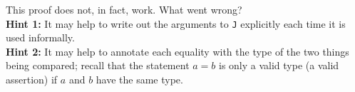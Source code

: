 \documentclass{article}
\begin{document}
\begin{enumerate}
    This proof does not, in fact, work.  What went wrong? \\
    \textbf{Hint 1:} It may help to write out the arguments to \texttt{J} explicitly each time it is used informally. \\
    \textbf{Hint 2:} It may help to annotate each equality with the type of the two things being compared; recall that the statement $a = b$ is only a valid type (a valid assertion) if $a$ and $b$ have the same type.
\end{enumerate}
\cfoot{}

\end{document}
